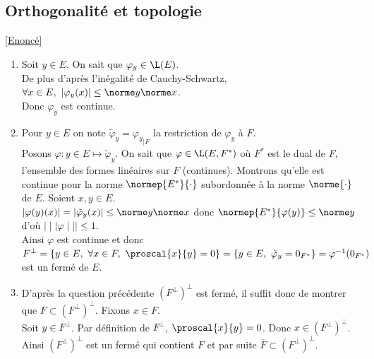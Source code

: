 \documentclass{book}
\begin{document}
	\subsection{Orthogonalité et topologie }
	\label{sec:orthogonalite-et-topologie}
	\textcolor{blue}{\hyperref[Orthogonalité et topologie]{[Enoncé]}}\\
	\begin{enumerate}[leftmargin=*]
		\item Soit $y\in E$. On sait que $\varphi_y\in \L(E)$.\\
		De plus d'après l'inégalité de Cauchy-Schwartz, $\forall x\in E,\ |\varphi_y(x)|\leq \norme y\norme x$.\\
		Donc $\varphi_y$ est continue.
		\item Pour $y\in E$ on note $\tilde\varphi_y={\varphi_y}_{|F}$ la restriction de $\varphi_y$ à $F$.\\
		Posons $\varphi:y\in E\mapsto \tilde\varphi_y$. On sait que $\varphi\in \L(E,F^*)$ où $F^*$ est le dual de $F$, l'ensemble des formes linéaires sur $F$ (continues). Montrons qu'elle est continue pour la norme $\normep{E^*}{\cdot}$ subordonnée à la norme $\norme{\cdot}$ de $E$. Soient $x,y\in E$.\\
		$|\varphi(y)(x)|=|\tilde\varphi_y(x)|\leq \norme y\norme x$ donc $\normep{E^*}{\varphi(y)}\leq \norme y$ d'où $\mid\mid\mid\varphi\mid\mid\mid\leq 1$.\\
		Ainsi $\varphi$ est continue et donc $F^\bot=\{y\in E,\ \forall x\in F,\ \proscal{x}{y}=0\}=\{y\in E,\ \tilde\varphi_y=0_{F^*}\}=\varphi^{-1}(0_{F^*})$ est un fermé de $E$.
		\item D'après la question précédente $(F^\bot)^\bot$ est fermé, il suffit donc de montrer que $F\subset (F^\bot)^\bot$. Fixons $x\in F$.\\
		Soit $y\in F^\bot$. Par définition de $F^\bot$, $\proscal{x}{y}=0$. Donc $x\in (F^\bot)^\bot$.\\
		Ainsi $(F^\bot)^\bot$ est un fermé qui contient $F$ et par suite $\overline F\subset (F^\bot)^\bot$.
	\end{enumerate}
	
\end{document}
